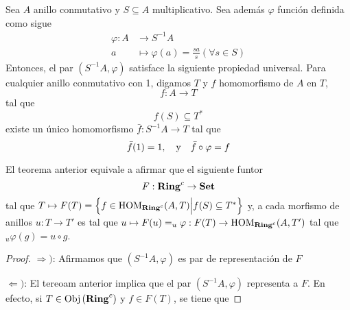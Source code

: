 \documentclass[12pt]{report}
\theoremstyle{largebreak}
\newcommand\cf[3]{\ensuremath{#1:#2\rightarrow#3}}
\newcommand{\Obj}[1]{\ensuremath{\textup{Obj}\left(#1\right)}}
\newcommand{\Cat}[1]{\ensuremath{\textup{\textbf{#1}}}}
\begin{document}
    \begin{theor}
        Sea $A$ anillo conmutativo y $S\subseteq A$ multiplicativo. Sea además $\varphi$ función definida como sigue
        \begin{equation*}
            \begin{split}
                \varphi:A&\rightarrow S^{-1}A\\
                a&\mapsto \varphi(a)=\frac{sa}{s} (\forall s\in S)
            \end{split}
        \end{equation*}
        Entonces, el par $(S^{-1}A,\varphi)$ satisface la siguiente propiedad universal. Para cualquier anillo conmutativo con 1, digamos $T$ y $f$ homomorfismo de $A$ en $T$,
        \begin{equation*}
            \cf{f}{A}{T}
        \end{equation*}
        tal que
        \begin{equation*}
            f(S)\subseteq T^*
        \end{equation*}
        existe un único homomorfismo $\cf{\bar{f}}{S^{-1}A}{T}$ tal que
        \begin{equation*}
            \bar{f}(1)=1,\quad\textup{y}\quad\bar{f}\circ\varphi=f
        \end{equation*}
    \end{theor}

    \begin{exa}
        El teorema anterior equivale a afirmar que el siguiente funtor
        \begin{equation*}
            F:\Cat{Ring}^c\rightarrow\Cat{Set}
        \end{equation*}
        tal que $T\mapsto F(T)=\left\{f\in\HOM{\Cat{Ring}^c}(A,T)\Big|f(S)\subseteq T^* \right\}$ y, a cada morfismo de anillos $\cf{u}{T}{T'}$ es tal que $u\mapsto\cf{F(u)=_u\varphi}{F(T)}{\HOM{\Cat{Ring}^c}(A,T')}$ tal que $_u\varphi(g)=u\circ g$.
    \end{exa}

    \begin{proof}
        $\Rightarrow)$: Afirmamos que $(S^{-1}A,\varphi)$ es par de representación de $F$

        $\Leftarrow)$: El tereoam anterior implica que el par $(S^{-1}A,\varphi)$ representa a $F$.
        En efecto, si $T\in\Obj{\Cat{Ring}^c}$ y $f\in F(T)$, se tiene que
    \end{proof}
\end{document}
